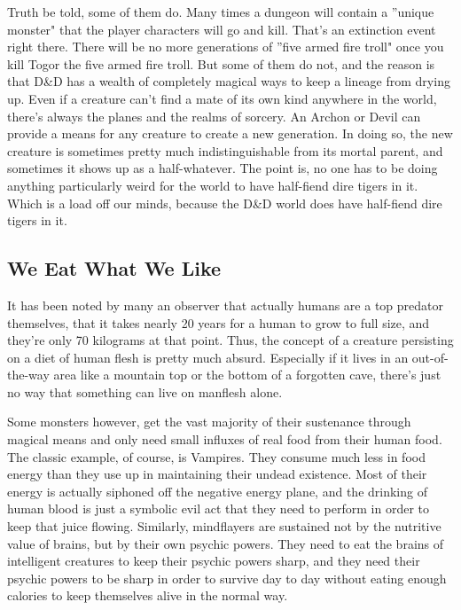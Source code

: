 Truth be told, some of them do. Many times a dungeon will contain a ''unique monster" that the player characters will go and kill. That's an extinction event right there. There will be no more generations of ''five armed fire troll" once you kill Togor the five armed fire troll. But some of them do not, and the reason is that D\&D has a wealth of completely magical ways to keep a lineage from drying up. Even if a creature can't find a mate of its own kind anywhere in the world, there's always the planes and the realms of sorcery. An Archon or Devil can provide a means for any creature to create a new generation. In doing so, the new creature is sometimes pretty much indistinguishable from its mortal parent, and sometimes it shows up as a half-whatever. The point is, no one has to be doing anything particularly weird for the world to have half-fiend dire tigers in it. Which is a load off our minds, because the D\&D world does have half-fiend dire tigers in it.

\subsection{We Eat What We Like}

It has been noted by many an observer that actually humans are a top predator themselves, that it takes nearly 20 years for a human to grow to full size, and they're only 70 kilograms at that point. Thus, the concept of a creature persisting on a diet of human flesh is pretty much absurd. Especially if it lives in an out-of-the-way area like a mountain top or the bottom of a forgotten cave, there's just no way that something can live on manflesh alone.

Some monsters however, get the vast majority of their sustenance through magical means and only need small influxes of real food from their human food. The classic example, of course, is Vampires. They consume much less in food energy than they use up in maintaining their undead existence. Most of their energy is actually siphoned off the negative energy plane, and the drinking of human blood is just a symbolic evil act that they need to perform in order to keep that juice flowing. Similarly, mindflayers are sustained not by the nutritive value of brains, but by their own psychic powers. They need to eat the brains of intelligent creatures to keep their psychic powers sharp, and they need their psychic powers to be sharp in order to survive day to day without eating enough calories to keep themselves alive in the normal way.

